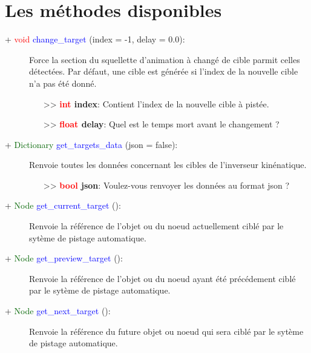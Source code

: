 \documentclass[a4paper, 11pt]{article}
\begin{document}
	\section{Les méthodes disponibles}
	\begin{description}
		\item [+ \textcolor{red}{void} \textcolor{blue}{change\_target} (index = -1, delay = 0.0):] Force la 
		section du squellette d'animation à changé de cible parmit celles détectées. Par défaut, une cible 
		est générée si l'index de la nouvelle cible n'a pas été donné.
		\begin{itemize}
			\item [>> \textbf{\textcolor{red}{int} index}:] Contient l'index de la nouvelle cible à pistée.
			\item [>> \textbf{\textcolor{red}{float} delay}:] Quel est le temps mort avant le changement ?\\
		\end{itemize}
	\end{description}
	\begin{description}
		\item [+ \textcolor{darkgreen}{Dictionary} \textcolor{blue}{get\_targets\_data} (json = false):] 
		Renvoie toutes les données concernant les cibles de l'inverseur kinénatique.
		\begin{itemize}
			\item [>> \textbf{\textcolor{red}{bool} json}:] Voulez-vous renvoyer les données au format json 
			?\\
		\end{itemize}
	\end{description}
	\begin{description}
		\item [+ \textcolor{darkgreen}{Node} \textcolor{blue}{get\_current\_target} ():] Renvoie la 
		référence de l'objet ou du noeud actuellement ciblé par le sytème de pistage automatique.\\
	\end{description}
	\begin{description}
		\item [+ \textcolor{darkgreen}{Node} \textcolor{blue}{get\_preview\_target} ():] Renvoie la 
		référence de l'objet ou du noeud ayant été précédement ciblé par le sytème de pistage automatique.\\
	\end{description}
	\begin{description}
		\item [+ \textcolor{darkgreen}{Node} \textcolor{blue}{get\_next\_target} ():] Renvoie la référence 
		du future objet ou noeud qui sera ciblé par le sytème de pistage automatique.\\
	\end{description}
\end{document}
